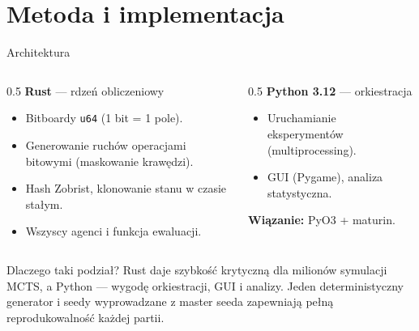 \documentclass[aspectratio=169,11pt]{beamer}
\begin{document}
\section{Metoda i implementacja}

\begin{frame}{Architektura}
    \begin{columns}[T]
    \begin{column}{0.5\textwidth}
        \textbf{Rust} — rdzeń obliczeniowy
        \begin{itemize}
            \item Bitboardy \texttt{u64} (1 bit = 1 pole).
            \item Generowanie ruchów operacjami bitowymi (maskowanie krawędzi).
            \item Hash Zobrist, klonowanie stanu w czasie stałym.
            \item Wszyscy agenci i funkcja ewaluacji.
        \end{itemize}
    \end{column}
    \begin{column}{0.5\textwidth}
        \textbf{Python 3.12} — orkiestracja
        \begin{itemize}
            \item Uruchamianie eksperymentów (multiprocessing).
            \item GUI (Pygame), analiza statystyczna.
        \end{itemize}
        \vspace{1ex}
        \textbf{Wiązanie:} PyO3 + maturin.
    \end{column}
    \end{columns}
    \vspace{1.5ex}
    \begin{block}{Dlaczego taki podział?}
        Rust daje szybkość krytyczną dla milionów symulacji MCTS, a Python —
        wygodę orkiestracji, GUI i analizy. Jeden deterministyczny generator i seedy wyprowadzane z master seeda zapewniają pełną
        reprodukowalność każdej partii.
    \end{block}
\end{frame}
\end{document}
